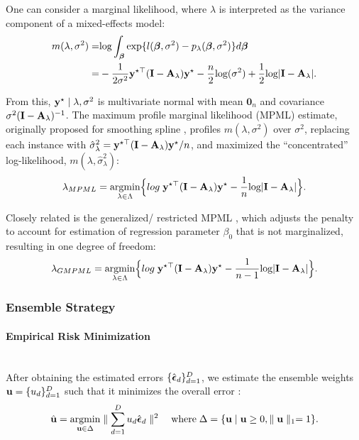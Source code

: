 \documentclass[article]{jss}
\begin{document}
One can consider a marginal likelihood, where $\lambda$ is interpreted as the variance component of a mixed-effects model:
\begin{align*}
m(\lambda, \sigma^2)=&\mbox{log} \int_{\boldsymbol{\beta}} \mbox{exp}\{ l(\boldsymbol{\beta}, \sigma^2)-p_\lambda(\boldsymbol{\beta}, \sigma^2)\}d\boldsymbol{\beta} \\=&-\frac{1}{2\sigma^2}{\bf y}^{\star \top}({\bf I}-{\bf A}_\lambda){\bf y}^\star-\frac{n}{2}\mbox{log}(\sigma^2)+\frac{1}{2}\mbox{log} | {\bf I}-{\bf A}_\lambda |.
\end{align*}

From this, ${\bf y}^\star \mid\lambda, \sigma^2$ is multivariate normal with mean $\mathbf{0}_n$ and covariance $\sigma^2({\bf I}-{\bf A}_\lambda)^{-1}$. The maximum profile marginal likelihood (MPML) estimate, originally proposed for smoothing spline \citep{wecker_signal_1983}, profiles $m(\lambda, \sigma^2)$ over $\sigma^2$, replacing each instance with $\hat{\sigma}_\lambda^2={\bf y}^{\star \top}({\bf I}-{\bf A}_\lambda){\bf y}^\star/n$, and maximized the ``concentrated'' log-likelihood, $m(\lambda, \hat{\sigma}_\lambda^2)$:
\begin{align*}
\lambda_{MPML}=\underset{\lambda \in \Lambda}{\mbox{argmin}}\Big\{log\; {\bf y}^{\star \top}({\bf I}-{\bf A}_\lambda){\bf y}^\star-\frac{1}{n}\mbox{log} | {\bf I}-{\bf A}_\lambda | \Big\}.
\end{align*}

Closely related is the generalized/ restricted MPML \citep{harville_maximum_1977, wahba_comparison_1985}, which adjusts the penalty to account for estimation of regression parameter $\beta_0$ that is not marginalized, resulting in one degree of freedom:
\begin{align}
\lambda_{GMPML}=\underset{\lambda \in \Lambda}{\mbox{argmin}}\Big\{log\; {\bf y}^{\star \top}({\bf I}-{\bf A}_\lambda){\bf y}^\star-\frac{1}{n-1}\mbox{log} | {\bf I}-{\bf A}_\lambda | \Big\}. \label{5}
\end{align}

\subsubsection{{Ensemble Strategy}}\label{ensemble}

\paragraph{Empirical Risk Minimization}\mbox{}\\
After obtaining the estimated errors $\{\hat{\boldsymbol{\epsilon}}_d\}_{d=1}^D$, we estimate the ensemble weights ${\bf u}=\{u_d\}_{d=1}^D$ such that it minimizes the overall error \citep{liu_robust_2017}:
\begin{align*}
\hat{{\bf u}}=\underset{{\bf u} \in \Delta}{\mbox{argmin}}\parallel \sum_{d=1}^Du_d\hat{\boldsymbol{\epsilon}}_d\parallel^2 \quad \mbox{where}\; \Delta=\{{\bf u} \mid {\bf u} \geq 0, \parallel {\bf u} \parallel_1=1\}.
\end{align*}
\end{document}
